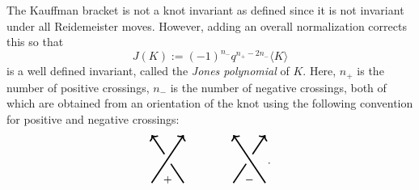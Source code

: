 \documentclass[a4paper,onecolumn,unpublished]{quantumarticle}
\theoremstyle{plain}
\theoremstyle{definition}
\theoremstyle{definition}
\numberwithin{equation}{section}
\newcommand{\hackcenter}[1]{
 \xy (0,0)*{#1}; \endxy}
\begin{document}
The Kauffman bracket is not a knot invariant as defined since it is not invariant under all Reidemeister moves.  However, adding an overall normalization corrects this so that 
\begin{equation}\label{eq:Jones-shift}
     J(K) := (-1)^{n_-} q^{n_+-2n_-} \langle K \rangle 
\end{equation}
is a well defined invariant, called the \emph{Jones polynomial} of $K$. Here, $n_+$ is the number of positive crossings, $n_-$ is the number of negative crossings, both of which are obtained from an orientation of the knot using the following convention for positive and negative crossings:
\begin{equation}\label{eq:sign-conv}
\hackcenter{
\begin{tikzpicture}
\draw[black,very thick,-> ] (-.5,0) -- (.5,1.5);
\draw[black,very thick ] (.5,0) -- (.1,.6);
\draw[black,very thick, -> ] (-.1,.9) -- (-.5,1.5);
 \node at (0,.1) {$+$};
\end{tikzpicture}}
\qquad  \qquad 
\hackcenter{
\begin{tikzpicture}
\draw[black,very thick,-> ] (.5,0) -- (-.5,1.5);
\draw[black,very thick ] (-.5,0) -- (-.1,.6);
\draw[black,very thick, -> ] (.1,.9) -- (.5,1.5);
 \node at (0,.1) {$-$};
\end{tikzpicture}}.
\end{equation}
\end{document}
